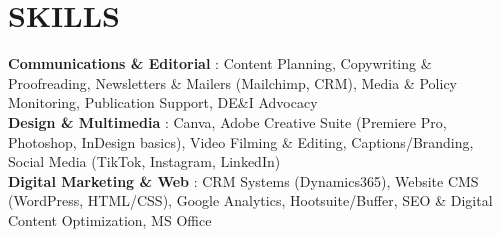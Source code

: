 \documentclass[letterpaper,11pt]{article}
\begin{document}
\section{SKILLS}
 \begin{itemize}[leftmargin=0in, label={}]
    \small{\item{
     \textbf{Communications \& Editorial} {: Content Planning, Copywriting \& Proofreading, Newsletters \& Mailers (Mailchimp, CRM), Media \& Policy Monitoring, Publication Support, DE\&I Advocacy} \\
     \textbf{Design \& Multimedia}       {: Canva, Adobe Creative Suite (Premiere Pro, Photoshop, InDesign basics), Video Filming \& Editing, Captions/Branding, Social Media (TikTok, Instagram, LinkedIn)} \\
     \textbf{Digital Marketing \& Web}   {: CRM Systems (Dynamics365), Website CMS (WordPress, HTML/CSS), Google Analytics, Hootsuite/Buffer, SEO \& Digital Content Optimization, MS Office} \\
    }}
 \end{itemize}
\end{document}
